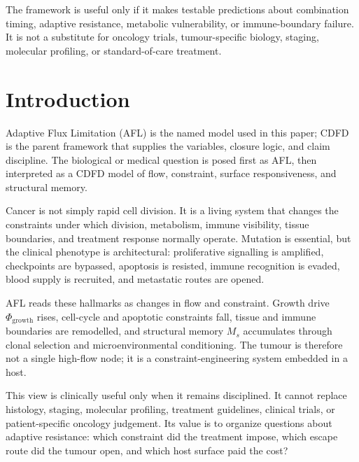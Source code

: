 \documentclass[12pt,a4paper]{article}
\begin{document}
The framework is useful only if it makes testable predictions about combination timing, adaptive resistance, metabolic vulnerability, or immune-boundary failure. It is not a substitute for oncology trials, tumour-specific biology, staging, molecular profiling, or standard-of-care treatment.


\vspace{0.5em}\noindent{}
\vspace{0.75em}

\section{Introduction}

Adaptive Flux Limitation (AFL) is the named model used in this paper; CDFD is the parent framework that supplies the variables, closure logic, and claim discipline. The biological or medical question is posed first as AFL, then interpreted as a CDFD model of flow, constraint, surface responsiveness, and structural memory.

Cancer is not simply rapid cell division. It is a living system that changes the constraints under which division, metabolism, immune visibility, tissue boundaries, and treatment response normally operate. Mutation is essential, but the clinical phenotype is architectural: proliferative signalling is amplified, checkpoints are bypassed, apoptosis is resisted, immune recognition is evaded, blood supply is recruited, and metastatic routes are opened.

AFL reads these hallmarks as changes in flow and constraint. Growth drive $\Phi_{\mathrm{growth}}$ rises, cell-cycle and apoptotic constraints fall, tissue and immune boundaries are remodelled, and structural memory $M_s$ accumulates through clonal selection and microenvironmental conditioning. The tumour is therefore not a single high-flow node; it is a constraint-engineering system embedded in a host.

This view is clinically useful only when it remains disciplined. It cannot replace histology, staging, molecular profiling, treatment guidelines, clinical trials, or patient-specific oncology judgement. Its value is to organize questions about adaptive resistance: which constraint did the treatment impose, which escape route did the tumour open, and which host surface paid the cost?
\end{document}
